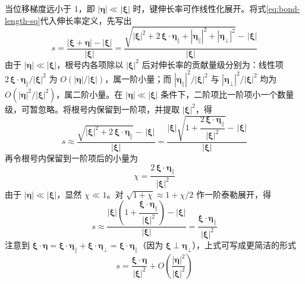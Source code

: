 当位移梯度远小于 1，即 $|\boldsymbol{\eta}|\ll|\boldsymbol{\xi}|$ 时，键伸长率可作线性化展开。将式\eqref{eq:bond-length-sq}代入伸长率定义，先写出
\begin{equation}
  s=\frac{|\boldsymbol{\xi}+\boldsymbol{\eta}|-|\boldsymbol{\xi}|}{|\boldsymbol{\xi}|}
  =\frac{\sqrt{|\boldsymbol{\xi}|^{2}+2\,\boldsymbol{\xi}\cdot\boldsymbol{\eta}_{\parallel}+|\boldsymbol{\eta}_{\parallel}|^{2}+|\boldsymbol{\eta}_{\perp}|^{2}}-\,|\boldsymbol{\xi}|}{|\boldsymbol{\xi}|}
\end{equation}
由于 $|\boldsymbol{\eta}|\ll|\boldsymbol{\xi}|$，根号内各项除以 $|\boldsymbol{\xi}|^{2}$ 后对伸长率的贡献量级分别为：线性项 $2\,\boldsymbol{\xi}\cdot\boldsymbol{\eta}_{\parallel}/|\boldsymbol{\xi}|^{2}$ 为 $O(|\boldsymbol{\eta}|/|\boldsymbol{\xi}|)$，属一阶小量；而 $|\boldsymbol{\eta}_{\parallel}|^{2}/|\boldsymbol{\xi}|^{2}$ 与 $|\boldsymbol{\eta}_{\perp}|^{2}/|\boldsymbol{\xi}|^{2}$ 均为 $O\!\left(|\boldsymbol{\eta}|^{2}/|\boldsymbol{\xi}|^{2}\right)$，属二阶小量。在 $|\boldsymbol{\eta}|\ll|\boldsymbol{\xi}|$ 条件下，二阶项比一阶项小一个数量级，可暂忽略。将根号内保留到一阶项，并提取 $|\boldsymbol{\xi}|^{2}$，得
\begin{equation}
  s\approx\frac{\sqrt{|\boldsymbol{\xi}|^{2}+2\,\boldsymbol{\xi}\cdot\boldsymbol{\eta}_{\parallel}}-\,|\boldsymbol{\xi}|}{|\boldsymbol{\xi}|}
  =\frac{|\boldsymbol{\xi}|\sqrt{1+\dfrac{2\,\boldsymbol{\xi}\cdot\boldsymbol{\eta}_{\parallel}}{|\boldsymbol{\xi}|^{2}}}-\,|\boldsymbol{\xi}|}{|\boldsymbol{\xi}|}
\end{equation}
再令根号内保留到一阶项后的小量为
\begin{equation}
  \chi=\frac{2\,\boldsymbol{\xi}\cdot\boldsymbol{\eta}_{\parallel}}{|\boldsymbol{\xi}|^{2}}
\end{equation}
由于 $|\boldsymbol{\eta}|\ll|\boldsymbol{\xi}|$，显然 $\chi\ll 1$。对 $\sqrt{1+\chi}\approx 1+\chi/2$ 作一阶泰勒展开，得
\begin{equation}
  s\approx\frac{|\boldsymbol{\xi}|\left(1+\dfrac{\boldsymbol{\xi}\cdot\boldsymbol{\eta}_{\parallel}}{|\boldsymbol{\xi}|^{2}}\right)-|\boldsymbol{\xi}|}{|\boldsymbol{\xi}|}
  =\frac{\boldsymbol{\xi}\cdot\boldsymbol{\eta}_{\parallel}}{|\boldsymbol{\xi}|^{2}}
\end{equation}
注意到 $\boldsymbol{\xi}\cdot\boldsymbol{\eta}=\boldsymbol{\xi}\cdot\boldsymbol{\eta}_{\parallel}+\boldsymbol{\xi}\cdot\boldsymbol{\eta}_{\perp}=\boldsymbol{\xi}\cdot\boldsymbol{\eta}_{\parallel}$（因为 $\boldsymbol{\xi}\perp\boldsymbol{\eta}_{\perp}$），上式可写成更简洁的形式
\begin{equation}
  s=\frac{\boldsymbol{\xi}\cdot\boldsymbol{\eta}}{|\boldsymbol{\xi}|^{2}}+O\!\left(\frac{|\boldsymbol{\eta}|^{2}}{|\boldsymbol{\xi}|^{2}}\right)
  \label{eq:stretch-linear}
\end{equation}
